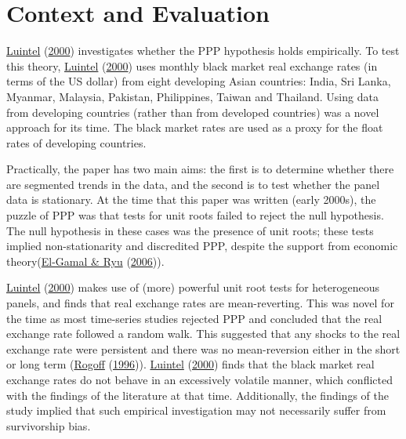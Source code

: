 \documentclass[11pt,preprint, authoryear]{elsarticle}
\numberwithin{equation}{section}
\numberwithin{figure}{section}
\numberwithin{table}{section}
\begin{document}
\hypertarget{context-and-evaluation}{%
\section{\texorpdfstring{Context and Evaluation
\label{Context}}{Context and Evaluation }}\label{context-and-evaluation}}

\protect\hyperlink{ref-Kul}{Luintel} (\protect\hyperlink{ref-Kul}{2000})
investigates whether the PPP hypothesis holds empirically. To test this
theory, \protect\hyperlink{ref-Kul}{Luintel}
(\protect\hyperlink{ref-Kul}{2000}) uses monthly black market real
exchange rates (in terms of the US dollar) from eight developing Asian
countries: India, Sri Lanka, Myanmar, Malaysia, Pakistan, Philippines,
Taiwan and Thailand. Using data from developing countries (rather than
from developed countries) was a novel approach for its time. The black
market rates are used as a proxy for the float rates of developing
countries.

Practically, the paper has two main aims: the first is to determine
whether there are segmented trends in the data, and the second is to
test whether the panel data is stationary. At the time that this paper
was written (early 2000s), the puzzle of PPP was that tests for unit
roots failed to reject the null hypothesis. The null hypothesis in these
cases was the presence of unit roots; these tests implied
non-stationarity and discredited PPP, despite the support from economic
theory(\protect\hyperlink{ref-puz}{El-Gamal \& Ryu}
(\protect\hyperlink{ref-puz}{2006})).

\protect\hyperlink{ref-Kul}{Luintel} (\protect\hyperlink{ref-Kul}{2000})
makes use of (more) powerful unit root tests for heterogeneous panels,
and finds that real exchange rates are mean-reverting. This was novel
for the time as most time-series studies rejected PPP and concluded that
the real exchange rate followed a random walk. This suggested that any
shocks to the real exchange rate were persistent and there was no
mean-reversion either in the short or long term
(\protect\hyperlink{ref-rog}{Rogoff}
(\protect\hyperlink{ref-rog}{1996})).
\protect\hyperlink{ref-Kul}{Luintel} (\protect\hyperlink{ref-Kul}{2000})
finds that the black market real exchange rates do not behave in an
excessively volatile manner, which conflicted with the findings of the
literature at that time. Additionally, the findings of the study implied
that such empirical investigation may not necessarily suffer from
survivorship bias.
\end{document}
